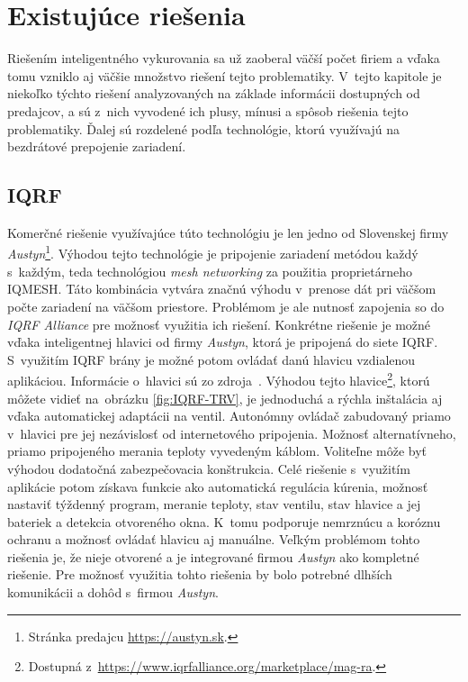 \section{Existujúce riešenia}\label{analyza-solutions}
Riešením inteligentného vykurovania sa už zaoberal väčší počet firiem a vďaka tomu vzniklo aj väčšie množstvo riešení tejto problematiky. 
V~tejto kapitole je niekoľko týchto riešení analyzovaných na základe informácii dostupných od predajcov, a sú z~nich vyvodené ich plusy, mínusi a spôsob riešenia tejto problematiky. 
Ďalej sú rozdelené podľa technológie, ktorú využívajú na bezdrátové prepojenie zariadení.

\subsection*{IQRF}
Komerčné riešenie využívajúce túto technológiu je len jedno od Slovenskej firmy \emph{Austyn}\footnote{Stránka predajcu \url{https://austyn.sk}.}. 
Výhodou tejto technológie je pripojenie zariadení metódou každý s~každým, teda technológiou \emph{mesh networking} za použitia proprietárneho IQMESH. 
Táto kombinácia vytvára značnú výhodu v~prenose dát pri väčšom počte zariadení na väčšom priestore. 
Problémom je ale nutnosť zapojenia so do \emph{IQRF Alliance} pre možnosť využitia ich riešení.
Konkrétne riešenie je možné vďaka inteligentnej hlavici od firmy \emph{Austyn}, ktorá je pripojená do siete IQRF. 
S~využitím IQRF brány je možné potom ovládať danú hlavicu vzdialenou aplikáciou. Informácie o~hlavici sú zo zdroja~\cite{Austyn_hlavica}. 
Výhodou tejto hlavice\footnote{Dostupná z~\url{https://www.iqrfalliance.org/marketplace/mag-ra}.}, ktorú môžete vidieť na~obrázku \ref{fig:IQRF-TRV}, je jednoduchá a rýchla inštalácia aj vďaka automatickej adaptácii na ventil. 
Autonómny ovládač zabudovaný priamo v~hlavici pre jej nezávislosť od internetového pripojenia. 
Možnosť alternatívneho, priamo pripojeného merania teploty vyvedeným káblom. 
Voliteľne môže byť výhodou dodatočná zabezpečovacia konštrukcia. 
Celé riešenie s~využitím aplikácie potom získava funkcie ako automatická regulácia kúrenia, možnosť nastaviť týždenný program, meranie teploty, stav ventilu, stav hlavice a jej bateriek a detekcia otvoreného okna.
K~tomu podporuje nemrznúcu a koróznu ochranu a možnosť ovládať hlavicu aj manuálne. Veľkým problémom tohto riešenia je, že nieje otvorené a je integrované firmou \emph{Austyn} ako kompletné riešenie. 
Pre možnosť využitia tohto riešenia by bolo potrebné dlhších komunikácii a dohôd s~firmou \emph{Austyn}.
